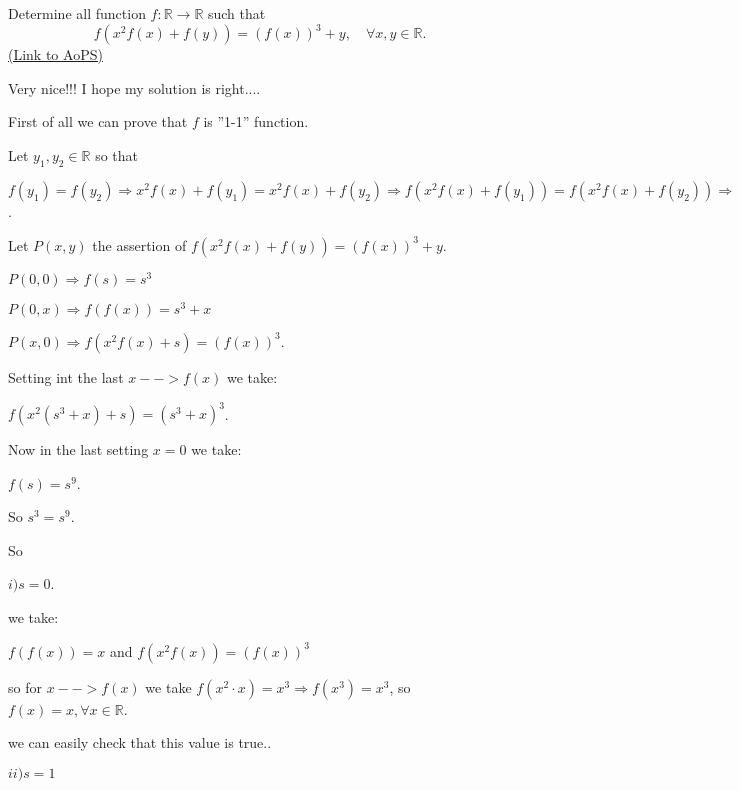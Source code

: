 \begin{problem}
	Determine all function $f: \mathbb R \to \mathbb R$ such that
\[ f(x^2f(x)+f(y))=(f(x))^3+y, \quad \forall x,y\in \mathbb R.\]
	\flushright \href{https://artofproblemsolving.com/community/c6h314427}{(Link to AoPS)}
\end{problem}



\begin{solution}
	Very nice!!!
I hope my solution is right....


First of all we can prove that $ f$ is ''1-1'' function.

Let $ y_1,y_2 \in \mathbb{R}$ so that 

$ f(y_1) = f(y_2) \Longrightarrow x^2f(x) + f(y_1) = x^2f(x) + f(y_2) \Longrightarrow f(x^2f(x) + f(y_1)) = f(x^2f(x) + f(y_2)) \Longrightarrow (f(x))^3 + y_1 = (f(x))^3 + y_2 \Longrightarrow y_1 = y_2$.

Let $ P(x,y)$ the assertion of $ f(x^2f(x) + f(y)) = (f(x))^3 + y$.

$ P(0,0) \Longrightarrow f(s) = s^3$

$ P(0,x) \Longrightarrow f(f(x)) = s^3 + x$

$ P(x,0) \Longrightarrow f(x^2f(x) + s) = (f(x))^3$.

Setting int the last $ x - - > f(x)$ we take:

$ f(x^2(s^3 + x) + s) = (s^3 + x)^3$.

Now in the last setting $ x = 0$ we take:

$ f(s) = s^9$.

So 
$ s^3 = s^9$.

So 

$ i)s = 0$.

we take:

$ f(f(x)) = x$ and $ f(x^2f(x)) = (f(x))^3$

so for $ x - - > f(x)$ we take $ f(x^2 \cdot x) = x^3 \Longrightarrow f(x^3) = x^3$, so ${ f(x) = x,\forall x \in \mathbb{R}}$.

we can easily check that this value is true..

$ ii)s = 1$


\end{solution}
